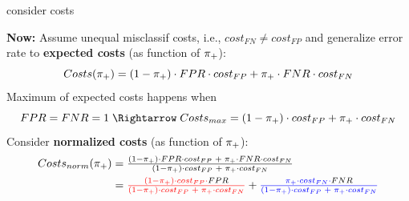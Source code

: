 \documentclass[11pt,compress,t,notes=noshow, xcolor=table]{beamer}
\begin{document}
\begin{vbframe}{consider costs}

\textbf{Now:} Assume unequal misclassif costs, i.e., $cost_{FN} \neq cost_{FP}$ and generalize error rate to \textbf{expected costs} (as function of $\pi_{+}$): %
$$Costs(\pi_{+}) = (1 - \pi_{+}) \cdot FPR \cdot cost_{FP} + \pi_{+} \cdot FNR \cdot cost_{FN}$$
Maximum of expected costs happens when
$$FPR=FNR=1 \; \Rightarrow \; Costs_{max} = (1 - \rp) \cdot cost_{FP} + \rp \cdot cost_{FN}$$
Consider \textbf{normalized costs} (as function of $\pi_{+}$):
\begin{align*}
Costs_{norm}(\pi_{+})
&= \tfrac{(1 - \pi_{+}) \cdot FPR \cdot cost_{FP}  \; + \; \pi_{+} \cdot FNR \cdot cost_{FN} }{(1 - \pi_{+}) \cdot cost_{FP} \; + \; \pi_{+} \cdot cost_{FN}}\\
&= {\color{red}\tfrac{(1 - \pi_{+})\cdot cost_{FP} \cdot {\color{black}FPR}}{(1 - \pi_{+}) \cdot cost_{FP} \; + \; \pi_{+} \cdot cost_{FN}}} + {\color{blue}\tfrac{\pi_{+} \cdot cost_{FN} \cdot {\color{black}FNR}}{(1 - \pi_{+}) \cdot cost_{FP} \; + \; \pi_{+} \cdot cost_{FN}}}
\end{align*}


\end{vbframe}
\end{document}

